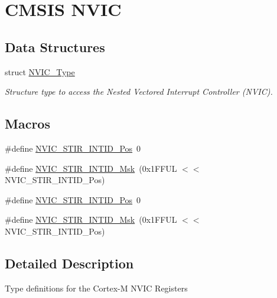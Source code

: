 \hypertarget{group___c_m_s_i_s___n_v_i_c}{\section{C\-M\-S\-I\-S N\-V\-I\-C}
\label{group___c_m_s_i_s___n_v_i_c}
}
\subsection*{Data Structures}
\begin{DoxyCompactItemize}
\item 
struct \hyperlink{struct_n_v_i_c___type}{N\-V\-I\-C\-\_\-\-Type}
\begin{DoxyCompactList}\small\item\em Structure type to access the Nested Vectored Interrupt Controller (N\-V\-I\-C). \end{DoxyCompactList}\end{DoxyCompactItemize}
\subsection*{Macros}
\begin{DoxyCompactItemize}
\item 
\#define \hyperlink{group___c_m_s_i_s___n_v_i_c_ga9eebe495e2e48d302211108837a2b3e8}{N\-V\-I\-C\-\_\-\-S\-T\-I\-R\-\_\-\-I\-N\-T\-I\-D\-\_\-\-Pos}~0
\item 
\#define \hyperlink{group___c_m_s_i_s___n_v_i_c_gae4060c4dfcebb08871ca4244176ce752}{N\-V\-I\-C\-\_\-\-S\-T\-I\-R\-\_\-\-I\-N\-T\-I\-D\-\_\-\-Msk}~(0x1\-F\-F\-U\-L $<$$<$ N\-V\-I\-C\-\_\-\-S\-T\-I\-R\-\_\-\-I\-N\-T\-I\-D\-\_\-\-Pos)
\item 
\#define \hyperlink{group___c_m_s_i_s___n_v_i_c_ga9eebe495e2e48d302211108837a2b3e8}{N\-V\-I\-C\-\_\-\-S\-T\-I\-R\-\_\-\-I\-N\-T\-I\-D\-\_\-\-Pos}~0
\item 
\#define \hyperlink{group___c_m_s_i_s___n_v_i_c_gae4060c4dfcebb08871ca4244176ce752}{N\-V\-I\-C\-\_\-\-S\-T\-I\-R\-\_\-\-I\-N\-T\-I\-D\-\_\-\-Msk}~(0x1\-F\-F\-U\-L $<$$<$ N\-V\-I\-C\-\_\-\-S\-T\-I\-R\-\_\-\-I\-N\-T\-I\-D\-\_\-\-Pos)
\end{DoxyCompactItemize}


\subsection{Detailed Description}
Type definitions for the Cortex-\/\-M N\-V\-I\-C Registers 

